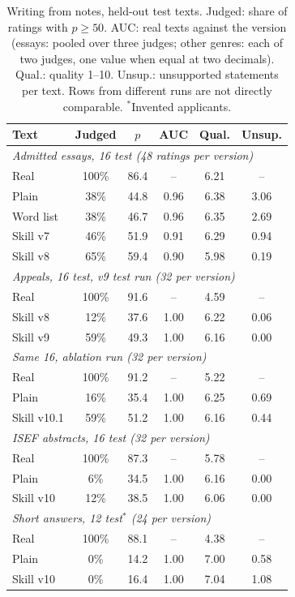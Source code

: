 \documentclass[11pt]{article}
\begin{document}
\begin{table}[t]
\centering\small
\setlength{\tabcolsep}{3pt}
\begin{tabular}{lccccc}
\toprule
Text & Judged & $p$ & AUC & Qual. & Unsup. \\
\midrule
\multicolumn{6}{l}{\emph{Admitted essays, 16 test (48 ratings per version)}} \\
Real & 100\% & 86.4 & -- & 6.21 & -- \\
Plain & 38\% & 44.8 & 0.96 & 6.38 & 3.06 \\
Word list & 38\% & 46.7 & 0.96 & 6.35 & 2.69 \\
Skill v7 & 46\% & 51.9 & 0.91 & 6.29 & 0.94 \\
Skill v8 & 65\% & 59.4 & 0.90 & 5.98 & 0.19 \\
\midrule
\multicolumn{6}{l}{\emph{Appeals, 16 test, v9 test run (32 per version)}} \\
Real & 100\% & 91.6 & -- & 4.59 & -- \\
Skill v8 & 12\% & 37.6 & 1.00 & 6.22 & 0.06 \\
Skill v9 & 59\% & 49.3 & 1.00 & 6.16 & 0.00 \\
\multicolumn{6}{l}{\emph{Same 16, ablation run (32 per version)}} \\
Real & 100\% & 91.2 & -- & 5.22 & -- \\
Plain & 16\% & 35.4 & 1.00 & 6.25 & 0.69 \\
Skill v10.1 & 59\% & 51.2 & 1.00 & 6.16 & 0.44 \\
\midrule
\multicolumn{6}{l}{\emph{ISEF abstracts, 16 test (32 per version)}} \\
Real & 100\% & 87.3 & -- & 5.78 & -- \\
Plain & 6\% & 34.5 & 1.00 & 6.16 & 0.00 \\
Skill v10 & 12\% & 38.5 & 1.00 & 6.06 & 0.00 \\
\midrule
\multicolumn{6}{l}{\emph{Short answers, 12 test$^{*}$ (24 per version)}} \\
Real & 100\% & 88.1 & -- & 4.38 & -- \\
Plain & 0\% & 14.2 & 1.00 & 7.00 & 0.58 \\
Skill v10 & 0\% & 16.4 & 1.00 & 7.04 & 1.08 \\
\bottomrule
\end{tabular}
\caption{Writing from notes, held-out test texts. Judged: share of ratings with $p \geq 50$. AUC: real texts against the version (essays: pooled over three judges; other genres: each of two judges, one value when equal at two decimals). Qual.: quality 1--10. Unsup.: unsupported statements per text. Rows from different runs are not directly comparable. $^{*}$Invented applicants.}
\label{tab:write}
\end{table}
\end{document}
